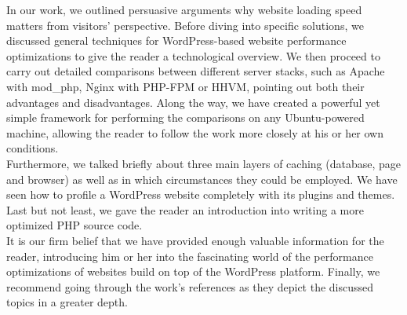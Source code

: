 In our work, we outlined persuasive arguments why website loading speed matters from visitors' perspective. Before diving into specific solutions, we discussed general techniques for WordPress-based website performance optimizations to give the reader a technological overview. We then proceed to carry out detailed comparisons between different server stacks, such as Apache with mod\_php, Nginx with PHP-FPM or HHVM, pointing out both their advantages and disadvantages. Along the way, we have created a powerful yet simple framework for performing the comparisons on any Ubuntu-powered machine, allowing the reader to follow the work more closely at his or her own conditions. \\

Furthermore, we talked briefly about three main layers of caching (database, page and browser) as well as in which circumstances they could be employed. We have seen how to profile a WordPress website completely with its plugins and themes. Last but not least, we gave the reader an introduction into writing a more optimized PHP source code. \\

It is our firm belief that we have provided enough valuable information for the reader, introducing him or her into the fascinating world of the performance optimizations of websites build on top of the WordPress platform. Finally, we recommend going through the work's references as they depict the discussed topics in a greater depth.
